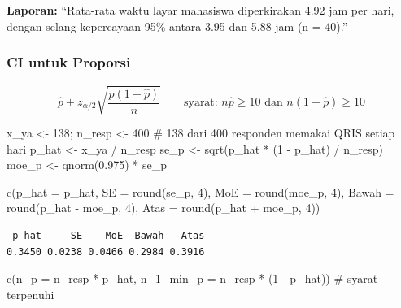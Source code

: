 \documentclass[
  indonesian,
  letterpaper,
]{book}
\newenvironment{Shaded}{\begin{snugshade}}{\end{snugshade}}
\newcommand{\AttributeTok}[1]{\textcolor[rgb]{0.40,0.45,0.13}{#1}}
\newcommand{\CommentTok}[1]{\textcolor[rgb]{0.37,0.37,0.37}{#1}}
\newcommand{\DecValTok}[1]{\textcolor[rgb]{0.68,0.00,0.00}{#1}}
\newcommand{\FloatTok}[1]{\textcolor[rgb]{0.68,0.00,0.00}{#1}}
\newcommand{\FunctionTok}[1]{\textcolor[rgb]{0.28,0.35,0.67}{#1}}
\newcommand{\NormalTok}[1]{\textcolor[rgb]{0.00,0.23,0.31}{#1}}
\newcommand{\OtherTok}[1]{\textcolor[rgb]{0.00,0.23,0.31}{#1}}
\newcommand{\SpecialCharTok}[1]{\textcolor[rgb]{0.37,0.37,0.37}{#1}}
\begin{document}
\textbf{Laporan:} ``Rata-rata waktu layar mahasiswa diperkirakan 4.92
jam per hari, dengan selang kepercayaan 95\% antara 3.95 dan 5.88 jam (n
= 40).''

\subsubsection{CI untuk Proporsi}\label{ci-untuk-proporsi}

\[\hat{p} \pm z_{\alpha/2} \sqrt{\frac{\hat{p}(1-\hat{p})}{n}} \qquad \text{syarat: } n\hat{p} \geq 10 \text{ dan } n(1-\hat{p}) \geq 10\]

\begin{Shaded}
\begin{Highlighting}[]
\NormalTok{x\_ya }\OtherTok{\textless{}{-}} \DecValTok{138}\NormalTok{; n\_resp }\OtherTok{\textless{}{-}} \DecValTok{400}    \CommentTok{\# 138 dari 400 responden memakai QRIS setiap hari}
\NormalTok{p\_hat }\OtherTok{\textless{}{-}}\NormalTok{ x\_ya }\SpecialCharTok{/}\NormalTok{ n\_resp}
\NormalTok{se\_p  }\OtherTok{\textless{}{-}} \FunctionTok{sqrt}\NormalTok{(p\_hat }\SpecialCharTok{*}\NormalTok{ (}\DecValTok{1} \SpecialCharTok{{-}}\NormalTok{ p\_hat) }\SpecialCharTok{/}\NormalTok{ n\_resp)}
\NormalTok{moe\_p }\OtherTok{\textless{}{-}} \FunctionTok{qnorm}\NormalTok{(}\FloatTok{0.975}\NormalTok{) }\SpecialCharTok{*}\NormalTok{ se\_p}

\FunctionTok{c}\NormalTok{(}\AttributeTok{p\_hat =}\NormalTok{ p\_hat, }\AttributeTok{SE =} \FunctionTok{round}\NormalTok{(se\_p, }\DecValTok{4}\NormalTok{), }\AttributeTok{MoE =} \FunctionTok{round}\NormalTok{(moe\_p, }\DecValTok{4}\NormalTok{),}
  \AttributeTok{Bawah =} \FunctionTok{round}\NormalTok{(p\_hat }\SpecialCharTok{{-}}\NormalTok{ moe\_p, }\DecValTok{4}\NormalTok{), }\AttributeTok{Atas =} \FunctionTok{round}\NormalTok{(p\_hat }\SpecialCharTok{+}\NormalTok{ moe\_p, }\DecValTok{4}\NormalTok{))}
\end{Highlighting}
\end{Shaded}

\begin{verbatim}
 p_hat     SE    MoE  Bawah   Atas 
0.3450 0.0238 0.0466 0.2984 0.3916 
\end{verbatim}

\begin{Shaded}
\begin{Highlighting}[]
\FunctionTok{c}\NormalTok{(}\AttributeTok{n\_p =}\NormalTok{ n\_resp }\SpecialCharTok{*}\NormalTok{ p\_hat, }\AttributeTok{n\_1\_min\_p =}\NormalTok{ n\_resp }\SpecialCharTok{*}\NormalTok{ (}\DecValTok{1} \SpecialCharTok{{-}}\NormalTok{ p\_hat))   }\CommentTok{\# syarat terpenuhi}
\end{Highlighting}
\end{Shaded}
\end{document}
